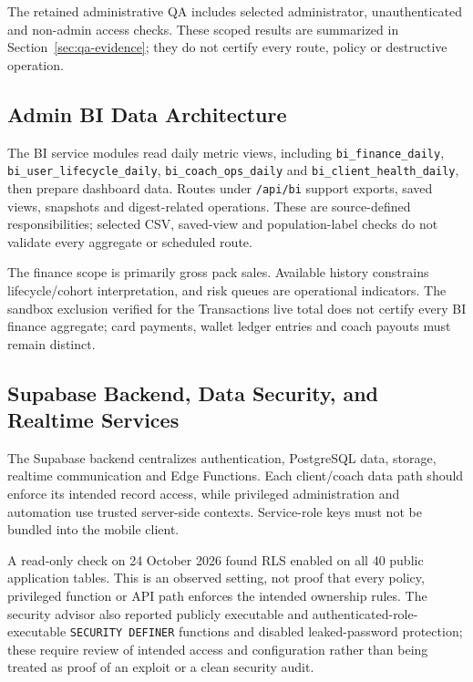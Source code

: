 \documentclass[12pt,a4paper,openany]{report}
\begin{document}
The retained administrative QA includes selected administrator, unauthenticated and non-admin access checks. These scoped results are summarized in Section~\ref{sec:qa-evidence}; they do not certify every route, policy or destructive operation.


\subsection{Admin BI Data Architecture}

The BI service modules read daily metric views, including \texttt{bi\_finance\_daily}, \texttt{bi\_user\_lifecycle\_daily}, \texttt{bi\_coach\_ops\_daily} and \texttt{bi\_client\_health\_daily}, then prepare dashboard data. Routes under \texttt{/api/bi} support exports, saved views, snapshots and digest-related operations. These are source-defined responsibilities; selected CSV, saved-view and population-label checks do not validate every aggregate or scheduled route.

The finance scope is primarily gross pack sales. Available history constrains lifecycle/cohort interpretation, and risk queues are operational indicators. The sandbox exclusion verified for the Transactions live total does not certify every BI finance aggregate; card payments, wallet ledger entries and coach payouts must remain distinct.

\subsection{Supabase Backend, Data Security, and Realtime Services}

The Supabase backend centralizes authentication, PostgreSQL data, storage, realtime communication and Edge Functions. Each client/coach data path should enforce its intended record access, while privileged administration and automation use trusted server-side contexts. Service-role keys must not be bundled into the mobile client.

A read-only check on 24 October 2026 found RLS enabled on all 40 public application tables. This is an observed setting, not proof that every policy, privileged function or API path enforces the intended ownership rules. The security advisor also reported publicly executable and authenticated-role-executable \texttt{SECURITY DEFINER} functions and disabled leaked-password protection; these require review of intended access and configuration rather than being treated as proof of an exploit or a clean security audit.
\end{document}
